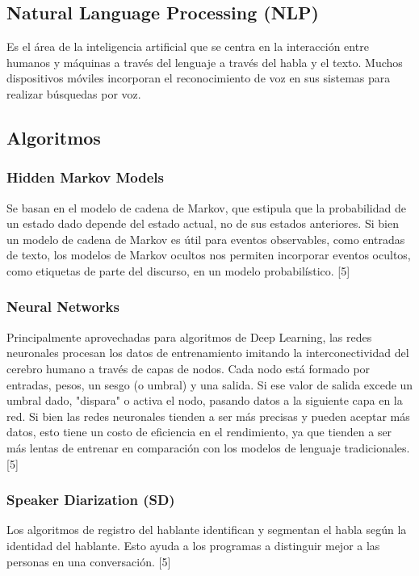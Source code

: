 \documentclass[twocolumn]{article}
\begin{document}
\subsection{Natural Language Processing (NLP)}

Es el área de la inteligencia artificial que se centra en la interacción entre humanos y máquinas a través del lenguaje a través del habla y el texto. Muchos dispositivos móviles incorporan el reconocimiento de voz en sus sistemas para realizar búsquedas por voz.

\subsection{Algoritmos}

\subsubsection{Hidden Markov Models}

Se basan en el modelo de cadena de Markov, que estipula que la probabilidad de un estado dado depende del estado actual, no de sus estados anteriores. Si bien un modelo de cadena de Markov es útil para eventos observables, como entradas de texto, los modelos de Markov ocultos nos permiten incorporar eventos ocultos, como etiquetas de parte del discurso, en un modelo probabilístico. [5]

\subsubsection{Neural Networks}

Principalmente aprovechadas para algoritmos de Deep Learning, las redes neuronales procesan los datos de entrenamiento imitando la interconectividad del cerebro humano a través de capas de nodos. Cada nodo está formado por entradas, pesos, un sesgo (o umbral) y una salida. Si ese valor de salida excede un umbral dado, "dispara" o activa el nodo, pasando datos a la siguiente capa en la red. Si bien las redes neuronales tienden a ser más precisas y pueden aceptar más datos, esto tiene un costo de eficiencia en el rendimiento, ya que tienden a ser más lentas de entrenar en comparación con los modelos de lenguaje tradicionales. [5]

\subsubsection{Speaker Diarization (SD)}

Los algoritmos de registro del hablante identifican y segmentan el habla según la identidad del hablante. Esto ayuda a los programas a distinguir mejor a las personas en una conversación. [5]
\end{document}
